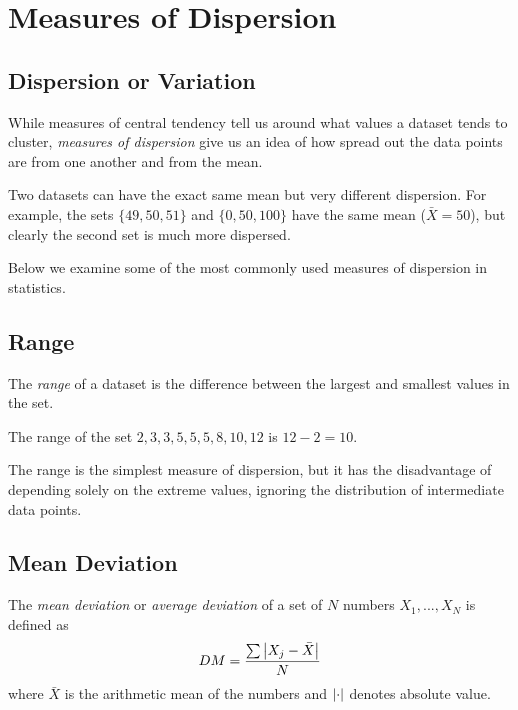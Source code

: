 \section{Measures of Dispersion}

\subsection{Dispersion or Variation}
While measures of central tendency tell us around what values a dataset tends to cluster, \emph{measures of dispersion} give us an idea of how spread out the data points are from one another and from the mean.

\begin{remark}
	Two datasets can have the exact same mean but very different dispersion. For example, the sets $\{49, 50, 51\}$ and $\{0, 50, 100\}$ have the same mean ($\bar{X} = 50$), but clearly the second set is much more dispersed.
\end{remark}

Below we examine some of the most commonly used measures of dispersion in statistics.

\subsection{Range}
The \emph{range} of a dataset is the difference between the largest and smallest values in the set.

\begin{example}
	The range of the set $2,3,3,5,5,5,8,10,12$ is $12-2=10.$
\end{example}

\begin{remark}
	The range is the simplest measure of dispersion, but it has the disadvantage of depending solely on the extreme values, ignoring the distribution of intermediate data points.
\end{remark}


\subsection{Mean Deviation}
The \emph{mean deviation} or \emph{average deviation} of a set of $N$ numbers $X_{1},...,X_{N}$ is defined as
\begin{align}
	DM=\dfrac{\sum \left|X_{j}-\bar{X}\right|}{N}
\end{align}
where $\bar{X}$ is the arithmetic mean of the numbers and $\left|\cdot\right|$ denotes absolute value.

